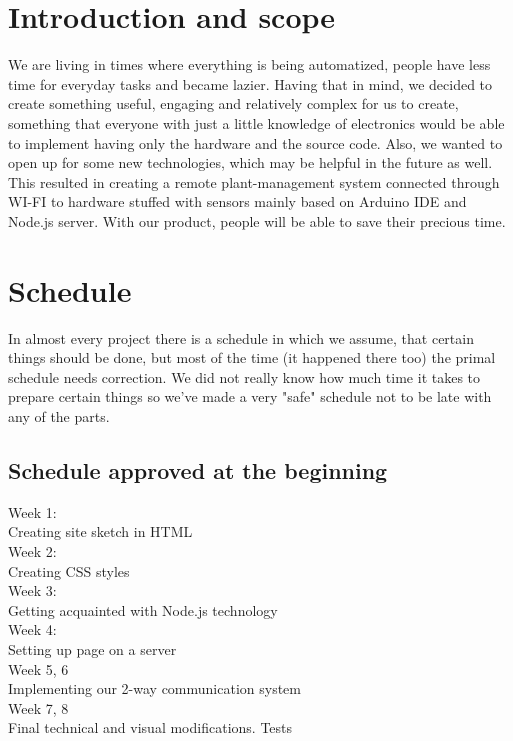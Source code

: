 \documentclass[oneside,a4paper,11pt]{report}
\begin{document}







\chapter{Introduction and scope}

We are living in times where everything is being automatized, people have less time for everyday tasks and became lazier. Having that in mind, we decided to create something useful, engaging and relatively complex for us to create, something that everyone with just a little knowledge of electronics would be able to implement having only the hardware and the source code. Also, we wanted to open up for some new technologies, which may be helpful in the future as well. This resulted in creating a remote plant-management system connected through WI-FI to hardware stuffed with sensors mainly based on Arduino IDE and Node.js server. With our product, people will be able to save their precious time.
\chapter{Schedule}
In almost every project there is a schedule in which we assume, that certain things should be done, but most of the time (it happened there too) the primal schedule needs correction. We did not really know how much time it takes to prepare certain things so we've made a very "safe" schedule not to be late with any of the parts.
\section{Schedule approved at the beginning}
Week 1:\\
Creating site sketch in HTML\\
Week 2:\\
Creating CSS styles\\
Week 3:\\
Getting acquainted with Node.js technology\\
Week 4:\\
Setting up page on a server\\
Week 5, 6\\
Implementing our 2-way communication system\\
Week 7, 8\\
Final technical and visual modifications. Tests\\\newpage
\end{document}
